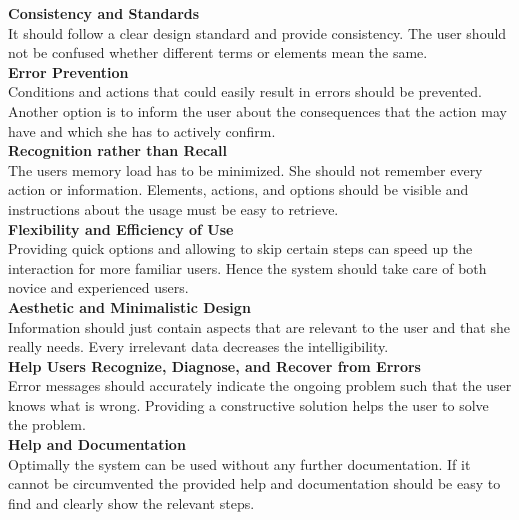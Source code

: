 \textbf{Consistency and Standards}\\
It should follow a clear design standard and provide consistency. The user should not be confused whether different terms or elements mean the same.\\

\textbf{Error Prevention}\\
Conditions and actions that could easily result in errors should be prevented. Another option is to inform the user about the consequences that the action may have and which she has to actively confirm.\\

\textbf{Recognition rather than Recall}\\
The users memory load has to be minimized. She should not remember every action or information. Elements, actions, and options should be visible and instructions about the usage must be easy to retrieve.\\

\textbf{Flexibility and Efficiency of Use}\\
Providing quick options and allowing to skip certain steps can speed up the interaction for more familiar users. Hence the system should take care of both novice and experienced users.\\

\textbf{Aesthetic and Minimalistic Design}\\
Information should just contain aspects that are relevant to the user and that she really needs. Every irrelevant data decreases the intelligibility.\\

\textbf{Help Users Recognize, Diagnose, and Recover from Errors}\\
Error messages should accurately indicate the ongoing problem such that the user knows what is wrong. Providing a constructive solution helps the user to solve the problem.\\

\textbf{Help and Documentation}\\
Optimally the system can be used without any further documentation. If it cannot be circumvented the provided help and documentation should be easy to find and clearly show the relevant steps.
\\

